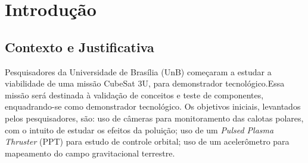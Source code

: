 



\chapter[Introdução]{Introdução}
\section{Contexto e Justificativa}
 
Pesquisadores da Universidade de Brasília (UnB) começaram a estudar a viabilidade de uma missão CubeSat 3U, para demonstrador tecnológico.Essa missão será destinada à validação de conceitos e teste de componentes, enquadrando-se como demonstrador tecnológico. Os objetivos iniciais, levantados pelos pesquisadores, são: uso de câmeras para monitoramento das calotas polares, com o intuito de estudar os efeitos da poluição; uso de um \textit{Pulsed Plasma Thruster} (PPT) para estudo de controle orbital;  uso de um acelerômetro para mapeamento do campo gravitacional terrestre.

